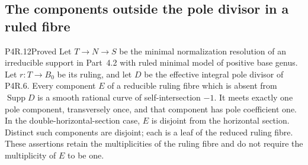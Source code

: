 \subsection{The components outside the pole divisor in a ruled fibre}

\begin{statement}{P4R.12}{Proved}
Let $T\to N\to S$ be the minimal normalization resolution of an
irreducible support in Part~4.2 with ruled minimal model of positive
base genus. Let $r:T\to B_0$ be its ruling, and let $D$ be the
effective integral pole divisor of P4R.6. Every component $E$ of a
reducible ruling fibre which is absent from $\operatorname{Supp}D$
is a smooth rational curve of self-intersection $-1$. It meets
exactly one pole component, transversely once, and that component
has pole coefficient one. In the double-horizontal-section case,
$E$ is disjoint from the horizontal section. Distinct such
components are disjoint; each is a leaf of the reduced ruling fibre.
These assertions retain the multiplicities of the ruling fibre
and do not require the multiplicity of $E$ to be one.
\end{statement}
